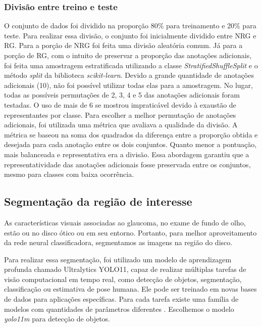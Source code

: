 \documentclass[12pt]{article}
\begin{document}
\subsubsection{Divisão entre treino e teste}
\label{sec:dataset:split}

O conjunto de dados foi dividido na proporção 80\% para treinamento e 20\% para teste. Para realizar essa divisão, o conjunto foi inicialmente dividido entre NRG e RG. Para a porção de NRG foi feita uma divisão aleatória comum. Já para a porção de RG, com o intuito de preservar a proporção das anotações adicionais, foi feita uma amostragem estratificada utilizando a classe \emph{StratifiedShuffleSplit} e o método \emph{split} da biblioteca \emph{scikit-learn}. Devido a grande quantidade de anotações adicionais (10), não foi possível utilizar todas elas para a amostragem. No lugar, todas as possíveis permutações de 2, 3, 4 e 5 das anotações adicionais foram testadas. O uso de mais de 6 se mostrou impraticável devido à exaustão de representantes por classe. Para escolher a melhor permutação de anotações adicionais, foi utilizada uma métrica que avaliava a qualidade da divisão. A métrica se baseou na soma dos quadrados da diferença entre a proporção obtida e desejada para cada anotação entre os dois conjuntos. Quanto menor a pontuação, mais balanceada e representativa era a divisão. Essa abordagem garantiu que a representatividade das anotações adicionais fosse preservada entre os conjuntos, mesmo para classes com baixa ocorrência.

\subsection{Segmentação da região de interesse}
\label{sec:segmentation}

As características visuais associadas ao glaucoma, no exame de fundo de olho, estão ou no disco ótico ou em seu entorno. Portanto, para melhor aproveitamento da rede neural classificadora, segmentamos as imagens na região do disco.

Para realizar essa segmentação, foi utilizado um modelo de aprendizagem profunda chamado Ultralytics YOLO11, capaz de realizar múltiplas tarefas de visão computacional em tempo real, como detecção de objetos, segmentação, classificação ou estimativa de pose humana. Ele pode ser treinado em novas bases de dados para aplicações específicas. Para cada tarefa existe uma família de modelos com quantidades de parâmetros diferentes \cite{YOLO_2023}. Escolhemos o modelo \emph{yolo11m} para detecção de objetos.
\end{document}
